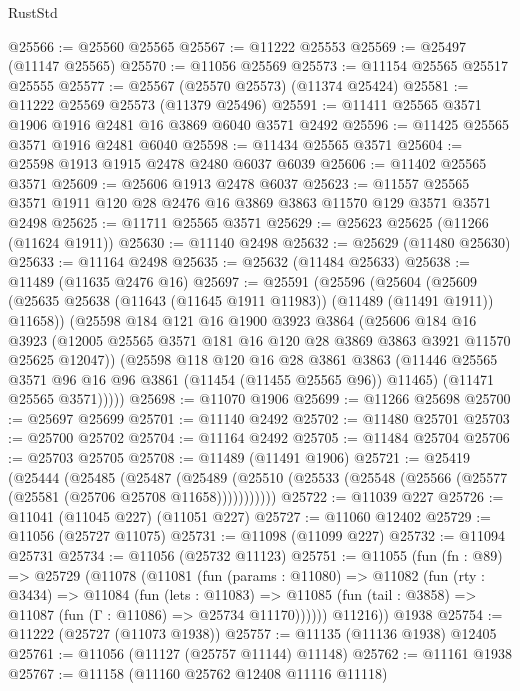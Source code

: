 \begin{lexlean}{RustStd}
\begin{coremodule}
@25566 := @25560 @25565
@25567 := @11222 @25553
@25569 := @25497 (@11147 @25565)
@25570 := @11056 @25569
@25573 := @11154 @25565 @25517 @25555
@25577 := @25567 (@25570 @25573) (@11374 @25424)
@25581 := @11222 @25569 @25573 (@11379 @25496)
@25591 := @11411 @25565 @3571 @1906 @1916 @2481 @16 @3869 @6040 @3571 @2492
@25596 := @11425 @25565 @3571 @1916 @2481 @6040
@25598 := @11434 @25565 @3571
@25604 := @25598 @1913 @1915 @2478 @2480 @6037 @6039
@25606 := @11402 @25565 @3571
@25609 := @25606 @1913 @2478 @6037
@25623 := @11557 @25565 @3571 @1911 @120 @28 @2476 @16 @3869 @3863 @11570 @129 @3571 @3571 @2498
@25625 := @11711 @25565 @3571
@25629 := @25623 @25625 (@11266 (@11624 @1911))
@25630 := @11140 @2498
@25632 := @25629 (@11480 @25630)
@25633 := @11164 @2498
@25635 := @25632 (@11484 @25633)
@25638 := @11489 (@11635 @2476 @16)
@25697 := @25591
    (@25596
      (@25604
        (@25609 (@25635 @25638 (@11643 (@11645 @1911 @11983)) (@11489 (@11491 @1911)) @11658))
        (@25598
          @184
          @121
          @16
          @1900
          @3923
          @3864
          (@25606
            @184
            @16
            @3923
            (@12005 @25565 @3571 @181 @16 @120 @28 @3869 @3863 @3921 @11570 @25625 @12047))
          (@25598
            @118
            @120
            @16
            @28
            @3861
            @3863
            (@11446 @25565 @3571 @96 @16 @96 @3861 (@11454 (@11455 @25565 @96)) @11465)
            (@11471 @25565 @3571)))))
@25698 := @11070 @1906
@25699 := @11266 @25698
@25700 := @25697 @25699
@25701 := @11140 @2492
@25702 := @11480 @25701
@25703 := @25700 @25702
@25704 := @11164 @2492
@25705 := @11484 @25704
@25706 := @25703 @25705
@25708 := @11489 (@11491 @1906)
@25721 := @25419
    (@25444
      (@25485
        (@25487
          (@25489 (@25510 (@25533 (@25548 (@25566 (@25577 (@25581 (@25706 @25708 @11658)))))))))))
@25722 := @11039 @227
@25726 := @11041 (@11045 @227) (@11051 @227)
@25727 := @11060 @12402
@25729 := @11056 (@25727 @11075)
@25731 := @11098 (@11099 @227)
@25732 := @11094 @25731
@25734 := @11056 (@25732 @11123)
@25751 := @11055
    (fun (fn : @89) =>
    @25729
      (@11078
        (@11081
          (fun (params : @11080) =>
          @11082
            (fun (rty : @3434) =>
            @11084
              (fun (lets : @11083) =>
              @11085 (fun (tail : @3858) => @11087 (fun (Γ : @11086) => @25734 @11170))))))
        @11216))
    @1938
@25754 := @11222 (@25727 (@11073 @1938))
@25757 := @11135 (@11136 @1938) @12405
@25761 := @11056 (@11127 (@25757 @11144) @11148)
@25762 := @11161 @1938
@25767 := @11158 (@11160 @25762 @12408 @11116 @11118)

\end{coremodule}
\end{lexlean}
